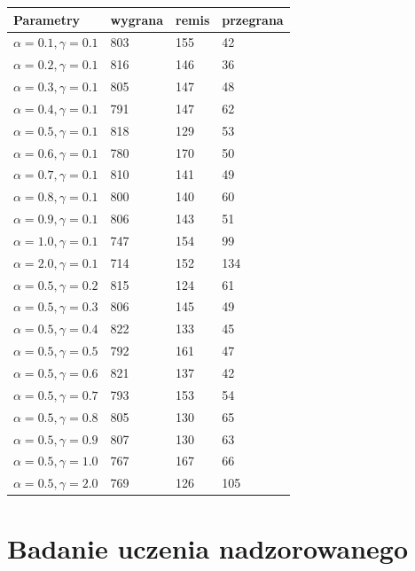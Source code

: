 \documentclass{article}
\begin{document}
\begin{center}
  \begin{tabular}{|l|l|l|l|}
    \hline
    Parametry & wygrana & remis & przegrana \\ \hline
    $\alpha = 0.1, \gamma = 0.1$ & 803 & 155 & 42 \\ \hline
    $\alpha = 0.2, \gamma = 0.1$ & 816 & 146 & 36 \\ \hline
    $\alpha = 0.3, \gamma = 0.1$ & 805 & 147 & 48 \\ \hline
    $\alpha = 0.4, \gamma = 0.1$ & 791 & 147 & 62 \\ \hline
    $\alpha = 0.5, \gamma = 0.1$ & 818 & 129 & 53 \\ \hline
    $\alpha = 0.6, \gamma = 0.1$ & 780 & 170 & 50 \\ \hline
    $\alpha = 0.7, \gamma = 0.1$ & 810 & 141 & 49 \\ \hline
    $\alpha = 0.8, \gamma = 0.1$ & 800 & 140 & 60 \\ \hline
    $\alpha = 0.9, \gamma = 0.1$ & 806 & 143 & 51 \\ \hline
    $\alpha = 1.0, \gamma = 0.1$ & 747 & 154 & 99 \\ \hline
    $\alpha = 2.0, \gamma = 0.1$ & 714 & 152 & 134 \\ \hline\hline
    $\alpha = 0.5, \gamma = 0.2$ & 815 & 124 & 61 \\ \hline
    $\alpha = 0.5, \gamma = 0.3$ & 806 & 145 & 49 \\ \hline
    $\alpha = 0.5, \gamma = 0.4$ & 822 & 133 & 45 \\ \hline
    $\alpha = 0.5, \gamma = 0.5$ & 792 & 161 & 47 \\ \hline
    $\alpha = 0.5, \gamma = 0.6$ & 821 & 137 & 42 \\ \hline
    $\alpha = 0.5, \gamma = 0.7$ & 793 & 153 & 54 \\ \hline
    $\alpha = 0.5, \gamma = 0.8$ & 805 & 130 & 65 \\ \hline
    $\alpha = 0.5, \gamma = 0.9$ & 807 & 130 & 63 \\ \hline
    $\alpha = 0.5, \gamma = 1.0$ & 767 & 167 & 66 \\ \hline
    $\alpha = 0.5, \gamma = 2.0$ & 769 & 126 & 105 \\ \hline
  \end{tabular}
\end{center}



\section{Badanie uczenia nadzorowanego}
\end{document}
